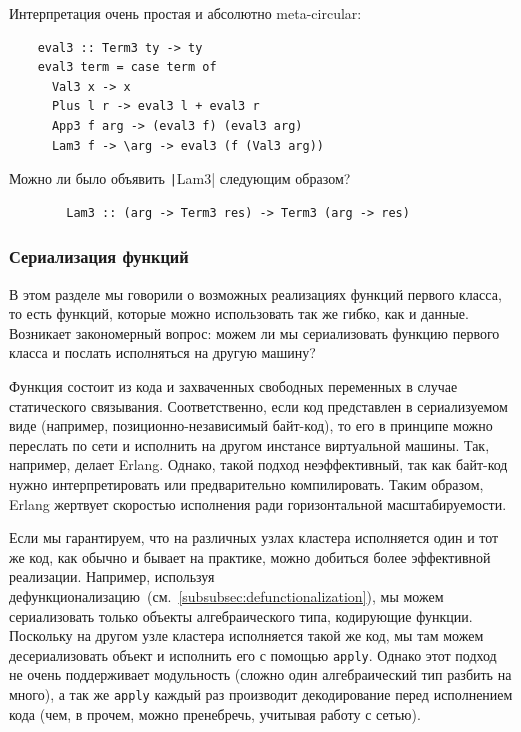 Интерпретация очень простая и абсолютно meta-circular:
\begin{verbatim}
    eval3 :: Term3 ty -> ty
    eval3 term = case term of
      Val3 x -> x
      Plus l r -> eval3 l + eval3 r
      App3 f arg -> (eval3 f) (eval3 arg)
      Lam3 f -> \arg -> eval3 (f (Val3 arg))
\end{verbatim}

\begin{task}
    Можно ли было объявить \texttt|Lam3| следующим образом?
    \begin{verbatim}
        Lam3 :: (arg -> Term3 res) -> Term3 (arg -> res)
    \end{verbatim}
\end{task}

\subsubsection{Сериализация функций}

В этом разделе мы говорили о возможных реализациях функций первого класса, то есть функций, которые можно использовать так же гибко, как и данные.
Возникает закономерный вопрос: можем ли мы сериализовать функцию первого класса и послать исполняться на другую машину?

Функция состоит из кода и захваченных свободных переменных в случае статического связывания.
Соответственно, если код представлен в сериализуемом виде (например, позиционно-независимый байт-код), то его в принципе можно переслать по сети и исполнить на другом инстансе виртуальной машины.
Так, например, делает Erlang.
Однако, такой подход неэффективный, так как байт-код нужно интерпретировать или предварительно компилировать.
Таким образом, Erlang жертвует скоростью исполнения ради горизонтальной масштабируемости.

Если мы гарантируем, что на различных узлах кластера исполняется один и тот же код, как обычно и бывает на практике, можно добиться более эффективной реализации.
Например, используя дефункционализацию~(см.~\ref{subsubsec:defunctionalization}), мы можем сериализовать только объекты алгебраического типа, кодирующие функции.
Поскольку на другом узле кластера исполняется такой же код, мы там можем десериализовать объект и исполнить его с помощью \texttt{apply}.
Однако этот подход не очень поддерживает модульность (сложно один алгебраический тип разбить на много), а так же \texttt{apply} каждый раз производит декодирование перед исполнением кода (чем, в прочем, можно пренебречь, учитывая работу с сетью).

